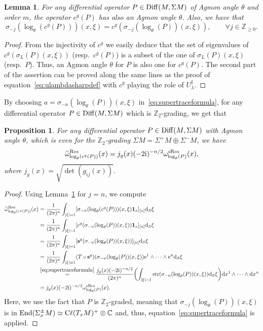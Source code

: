 \documentclass[10pt,a4paper]{amsart}
\numberwithin{equation}{section}
\newtheorem{lem}[thm]{Lemma}
\newtheorem{prop}[thm]{Proposition}
\theoremstyle{definition}
\newcommand{\C}{\mathbb C}
\newcommand{\Z}{\mathbb Z}
\newcommand{\Cl}{{\rm C}\ell}
\def \bui#1#2{\mathrel{\mathop{\kern 0pt#1}\limits^{#2}}}
\begin{document}
\begin{lem} \label{lem:sigmalo} For any differential operator $P\in {\rm Diff}(M,\Sigma M)$ of Agmon angle $\theta$ and order $m$, the operator $c^g(P)$ has also an Agmon angle $\theta$. Also, we have that
\[\sigma_{-j}(\log _\theta (c^g(P)))(x,\xi)=c^g(\sigma_{-j}(\log _\theta(P))(x,\xi)),\qquad \forall j\in \Z_{\geq 0}. \]
\end{lem}

\begin{proof} From the injectivity of $c^g$ we easily deduce that the set of eigenvalues of $c^g(\sigma_L(P)(x,\xi))$ (resp.\ $c^g(P)$) is a subset of the one of $\sigma_L(P)(x,\xi)$ (resp.\ $P$). Thus, an Agmon angle $\theta$ for $P$ is also one for $c^g(P)$.
The second part of the assertion can be proved along the same lines as the proof of equation~\eqref{eq:ulambdasharpdef} with $c^g$ playing the role of $U_\lambda^\sharp$.
\end{proof}

By choosing $a=\sigma_{-n} (\log_\theta (P)) (x, \xi)$ in~\eqref{eq:supertraceformula}, for any differential operator $P\in {\rm Diff}(M,\Sigma M)$ which is $\Z_2$-grading, we get that

\begin{prop}\label{prop:tildeomegavsomega}
For any differential operator $P\in {\rm Diff}(M,\Sigma M)$ with Agmon angle $\theta$, which is even for the $\Z_2$-grading $\Sigma M=\Sigma^+ M\oplus \Sigma^- M$, we have
\[\widetilde \omega^{\rm Res}_{\log_\theta (c^g(P))}(x)=j_g(x)(-2{\rm i})^{-n/2}\omega^{\rm sRes}_{\log_\theta (P)}(x),\]
where $j_g(x)=\sqrt{\det  (g_{ij}(x))}$.
\end{prop}
\begin{proof} Using Lemma~\ref{lem:sigmalo} for $j=n$, we compute
\begin{align*}
\widetilde \omega^{\rm Res}_{\log_\theta (c^g(P))}(x)&{}=\frac{1}{(2\pi)^n}\int_{|\xi|=1} [ \sigma_{-n} (\log_\theta (c^g(P))) (x, \xi) {\bf 1}_x ]_{[n]} {\rm d}_S\xi\\
&{}=\frac{1}{(2\pi)^n}\int_{|\xi|=1} [ c^g(\sigma_{-n} (\log_\theta (P)) (x, \xi)) {\bf 1}_x ]_{[n]} {\rm d}_S\xi\\
&{}=\frac{1}{(2\pi)^n}\int_{|\xi|=1} [ {\bf s}^g(\sigma_{-n} (\log_\theta (P)) (x, \xi)) ]_{[n]} {\rm d}_S\xi\\
&{}=\frac{1}{(2\pi)^n}\int_{|\xi|=1} (T\circ {\bf s}^g)(\sigma_{-n} (\log_\theta (P)) (x, \xi) ){\rm e}^1\wedge\dots \wedge {\rm e}^n {\rm d}_S\xi\\
&{}\bui{=}{\eqref{eq:supertraceformula}}\frac{j_g(x)(-2{\rm i})^{-n/2}}{(2\pi)^n}\biggl(\int_{|\xi|=1}{\rm str} (\sigma_{-n}(\log_\theta (P)) (x, \xi) ) {\rm d}_S\xi \biggr) {\rm d}x^1\wedge\dots\wedge {\rm d}x^n\\
&{}=j_g(x)(-2{\rm i})^{-n/2} \omega^{\rm sRes}_{\log_\theta (P)}(x).
\end{align*}
Here, we use the fact that $P$ is $\Z_2$-graded, meaning that $\sigma_{-j}(\log _\theta (P))(x,\xi)$ is in $\operatorname{End}(\Sigma_x^{\pm} M)\simeq \Cl(T_xM)^+\otimes \C$ and, thus, equation~\eqref{eq:supertraceformula} is applied.
\end{proof}
\end{document}
